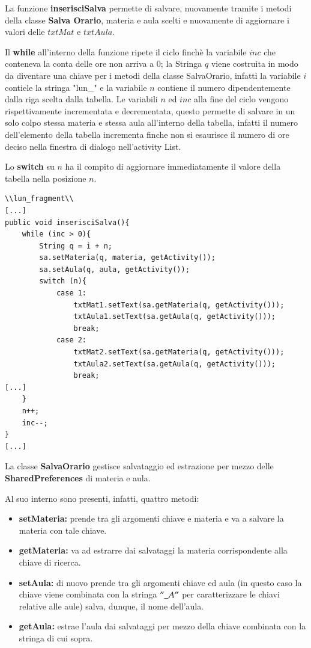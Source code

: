 \documentclass[a4paper, 50pt, twoside]{article}
\begin{document}
La funzione \textbf{inserisciSalva} permette di salvare, nuovamente tramite i metodi della classe \textbf{Salva Orario}, materia e aula scelti e nuovamente di aggiornare i valori delle $txtMat$ e $txtAula$.

Il \textbf{while} all'interno della funzione ripete il ciclo finchè la variabile $inc$ che conteneva la conta delle ore non arriva a 0; la Stringa $q$ viene costruita in modo da diventare una chiave per i metodi della classe SalvaOrario, infatti la variabile $i$ contiele la stringa "lun\_" e la variabile $n$ contiene il numero dipendentemente dalla riga scelta dalla tabella. Le variabili $n$ ed $inc$ alla fine del ciclo vengono rispettivamente incrementata e decrementata, questo permette di salvare in un solo colpo stessa materia e stessa aula all'interno della tabella, infatti il numero dell'elemento della tabella incrementa finche non si esaurisce il numero di ore deciso nella finestra di dialogo nell'activity List.

Lo \textbf{switch} su $n$ ha il compito di aggiornare immediatamente il valore della tabella nella posizione $n$.
\begin{lstlisting}
\\lun_fragment\\
[...]
public void inserisciSalva(){
	while (inc > 0){
		String q = i + n;
		sa.setMateria(q, materia, getActivity());
		sa.setAula(q, aula, getActivity());
		switch (n){
			case 1:
				txtMat1.setText(sa.getMateria(q, getActivity()));
				txtAula1.setText(sa.getAula(q, getActivity()));
				break;
			case 2:
				txtMat2.setText(sa.getMateria(q, getActivity()));
				txtAula2.setText(sa.getAula(q, getActivity()));
				break;
[...]
	}
	n++;
	inc--;
}
[...]
\end{lstlisting}

La classe \textbf{SalvaOrario} gestisce salvataggio ed estrazione per mezzo delle \textbf{SharedPreferences} di materia e aula.

Al suo interno sono presenti, infatti, quattro metodi:
\begin{itemize}
\item \textbf{setMateria:} prende tra gli argomenti chiave e materia e va a salvare la materia con tale chiave.
\item \textbf{getMateria:} va ad estrarre dai salvataggi la materia corrispondente alla chiave di ricerca.
\item \textbf{setAula:} di nuovo prende tra gli argomenti chiave ed aula (in questo caso la chiave viene combinata con la stringa $"\_A"$ per caratterizzare le chiavi relative alle aule) salva, dunque, il nome dell'aula.
\item \textbf{getAula:} estrae l'aula dai salvataggi per mezzo della chiave combinata con la stringa di cui sopra.
\end{itemize}
\end{document}
